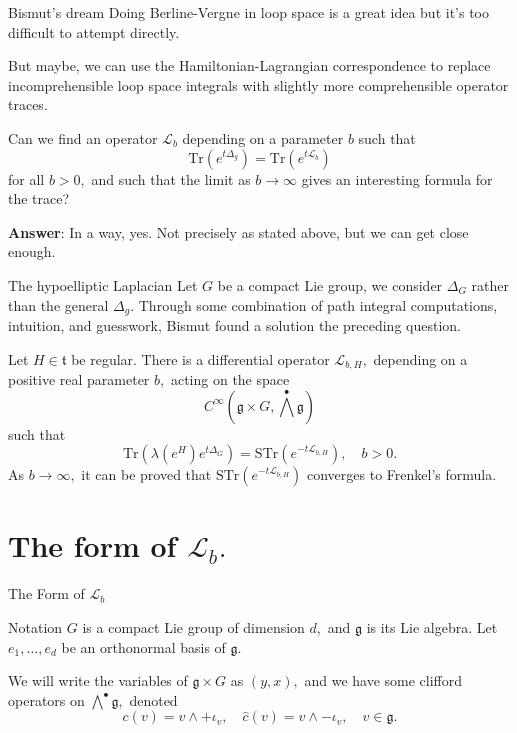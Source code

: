 \documentclass{beamer}
\numberwithin{equation}{section}
\theoremstyle{plain}
\theoremstyle{plain}
\theoremstyle{definition}
\theoremstyle{plain}
\theoremstyle{plain}
\theoremstyle{definition}
\newcommand{\Lc}{\mathcal{L}}
\newcommand{\Tr}{\mathrm{Tr}}
\newcommand{\gf}{\mathfrak{g}}
\newcommand{\tf}{\mathfrak{t}}
\newcommand{\Str}{\mathrm{STr}}
\begin{document}
\begin{frame}{Bismut's dream}
  Doing Berline-Vergne in loop space is a great idea but it's too difficult to attempt directly.
  
  But maybe, we can use the Hamiltonian-Lagrangian correspondence to replace incomprehensible loop space integrals with slightly more comprehensible operator traces.
  \begin{center}
    Can we find an operator $\Lc_b$ depending on a parameter $b$ such that
    \[
      \Tr(e^{t\Delta_g}) = \Tr(e^{t\Lc_b})
    \]
    for all $b>0,$ and such that the limit as $b\to\infty$ gives an interesting formula for the trace?
  \end{center}
  \textbf{Answer}: In a way, yes. Not precisely as stated above, but we can get close enough.
\end{frame}

\begin{frame}{The hypoelliptic Laplacian}
  Let $G$ be a compact Lie group, we consider $\Delta_G$ rather than the general $\Delta_g.$ Through some combination of path integral computations, intuition, and guesswork, Bismut found a solution the preceding question.
  \begin{theorem}[Bismut (2011)]
    Let $H\in \tf$ be regular. There is a differential operator $\Lc_{b,H},$ depending on a positive real parameter $b,$ acting on the space
    \[
      C^\infty(\gf\times G,\bigwedge^{\bullet}\gf)
    \]
    such that
    \[
       \Tr(\lambda(e^H)e^{t\Delta_G}) = \Str(e^{-t\Lc_{b,H}}),\quad b>0.
    \]
    As $b\to\infty,$ it can be proved that $\Str(e^{-t\Lc_{b,H}})$ converges to Frenkel's formula.
  \end{theorem}
\end{frame}

\section{The form of $\Lc_b.$}

\begin{frame}
  \huge{The Form of $\Lc_b$}
\end{frame}

\begin{frame}{Notation}
  $G$ is a compact Lie group of dimension $d,$ and $\gf$ is its Lie algebra. Let $e_1,\ldots,e_d$ be an orthonormal basis of $\gf.$
  
  We will write the variables of $\gf\times G$ as $(y,x),$ and we have some clifford operators on $\bigwedge^{\bullet}\gf,$ denoted
  \[
    c(v) = v\wedge + \iota_v,\quad \widehat{c}(v) = v\wedge -\iota_v,\quad v \in \gf.
  \]
\end{frame}
\end{document}
